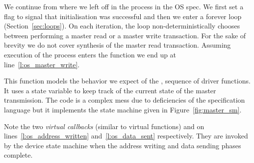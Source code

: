 We continue from where we left off in the  process in the OS spec. We first set a flag to signal that initialisation was successful and then we enter a forever loop (Section~\ref{sec:loops}). On each iteration, the loop non-deterministically chooses between performing a master read or a master write transaction. For the sake of brevity we do not cover synthesis of the master read transaction. Assuming execution of the process enters the  function we end up at line~\ref{l:os_master_write}.

This function models the behavior we expect of the ,   sequence of driver functions. It uses a state variable  to keep track of the current state of the master transmission. The code is a complex mess due to deficiencies of the specification language but it implements the state machine given in Figure~\ref{fig:master_sm}.

Note the two \emph{virtual callbacks} (similar to virtual functions)  and  on lines~\ref{l:os_address_written} and~\ref{l:os_data_sent} respectively. They are invoked by the device state machine when the address writing and data sending phases complete. 


%
%
%
%
